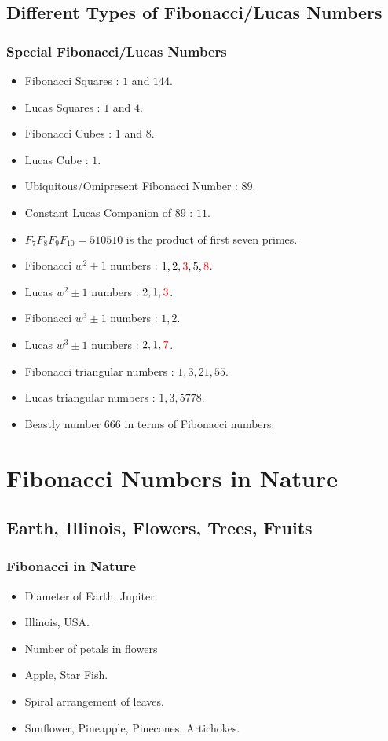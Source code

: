 \documentclass{beamer}
\begin{document}
\subsection{Different Types of Fibonacci/Lucas Numbers}
\begin{frame}
\frametitle{Special Fibonacci/Lucas Numbers}
	\begin{itemize}
		\item Fibonacci Squares : $1$ and $144$.
		\item Lucas Squares : $1$ and $4$.
		\item Fibonacci Cubes : $1$ and $8$.
		\item Lucas Cube : $1$.
		\item Ubiquitous/Omipresent Fibonacci Number : $89$.
		\item Constant Lucas Companion of $89$ : $11$.
		\item $F_7 F_8 F_9 F_{10} = 510510 $ is the product of first seven primes.
		\item Fibonacci $w^2 \pm 1$ numbers : $1,2,\textcolor{red}{3},5,\textcolor{red}{8}$.
		\item Lucas $w^2 \pm 1$ numbers : $2,1,\textcolor{red}{3}$.
		\item Fibonacci $w^3 \pm 1$ numbers : $1,2$.
		\item Lucas $w^3 \pm 1$ numbers : $2,1,\textcolor{red}{7}$.
		\item Fibonacci triangular numbers : $1,3,21,55$.
		\item Lucas triangular numbers : $1,3,5778$.
		\item Beastly number $666$ in terms of Fibonacci numbers.
	\end{itemize}
\end{frame}

\section{Fibonacci Numbers in Nature}
\subsection{Earth, Illinois, Flowers, Trees, Fruits}
\begin{frame}
\frametitle{Fibonacci in Nature}
	\begin{itemize}
		\item Diameter of Earth, Jupiter.
		\item Illinois, USA.
		\item Number of petals in flowers
		\item Apple, Star Fish.
		\item Spiral arrangement of leaves.
		\item Sunflower, Pineapple, Pinecones, Artichokes.
	\end{itemize}
\end{frame}
\end{document}
